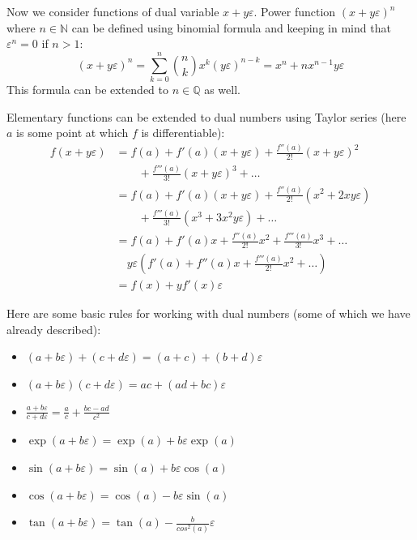 \documentclass[reprint,amsmath,amssymb,aps,pre,showkeys,showpacs]{revtex4-1}
\begin{document}
Now we consider functions of dual variable $x + y\varepsilon$. Power function
$(x + y\varepsilon)^n$ where $n \in \mathbb{N}$ can be defined using binomial
formula and keeping in mind that $\varepsilon^n = 0$ if $n>1$:
\begin{equation*}
  (x + y\varepsilon)^n = \sum_{k=0}^n \binom{n}{k} x^k (y\varepsilon)^{n-k} =
  x^n + n x^{n-1} y \varepsilon
\end{equation*}
This formula can be extended to $n \in \mathbb{Q}$ as well.

Elementary functions can be extended to dual numbers using Taylor series (here
$a$ is some point at which $f$ is differentiable):
\begin{align*}
  f(x + y\varepsilon) &= f(a) + f'(a)(x + y\varepsilon) + \frac{f''(a)}{2!}(x + y\varepsilon)^2 \\
  & \qquad + \frac{f'''(a)}{3!}(x + y\varepsilon)^3 + \dots \\
  &= f(a) + f'(a)(x + y\varepsilon) + \frac{f''(a)}{2!}(x^2 + 2xy\varepsilon) \\
  & \qquad + \frac{f'''(a)}{3!}(x^3 + 3x^2y\varepsilon) + \dots \\
  &= f(a) + f'(a)x + \frac{f''(a)}{2!}x^2 + \frac{f'''(a)}{3!}x^3 + \dots \\
  & \quad y\varepsilon(f'(a) + f''(a)x + \frac{f'''(a)}{2!}x^2 + \dots) \\
  &= f(x) + yf'(x)\varepsilon
\end{align*}

Here are some basic rules for working with dual numbers (some of which we have
already described):
\begin{itemize}
\item $(a + b\varepsilon) + (c + d\varepsilon) = (a + c) + (b + d)\varepsilon$
\item $(a + b\varepsilon) (c + d\varepsilon) = ac + (ad + bc)\varepsilon$
\item $\frac{a + b\varepsilon}{c + d\varepsilon} = \frac{a}{c} + \frac{bc - ad}{c^2}$
\item $\exp(a + b\varepsilon) = \exp(a) + b\varepsilon\exp(a)$
\item $\sin(a + b\varepsilon) = \sin(a) + b\varepsilon\cos(a)$
\item $\cos(a + b\varepsilon) = \cos(a) - b\varepsilon\sin(a)$
\item $\tan(a + b\varepsilon) = \tan(a) - \frac{b}{cos^2(a)}\varepsilon$
\end{itemize}
\end{document}
